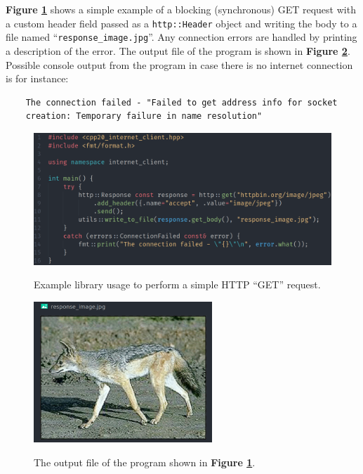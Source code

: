\documentclass[12pt, a4paper]{article}
\begin{document}
\textbf{Figure \ref{fig:get_request_example}} shows a simple example of a blocking (synchronous) GET request with a custom header field passed as a \texttt{http::Header} object and writing the body to a file named “\texttt{response\_image.jpg}”. Any connection errors are handled by printing a description of the error. The output file of the program is shown in \textbf{Figure \ref{fig:get_request_output}}. Possible console output from the program in case there is no internet connection is for instance:
\begin{verbatim}
    The connection failed - "Failed to get address info for socket 
    creation: Temporary failure in name resolution"
\end{verbatim}

\begin{figure}[hp]
	\centering
	\caption{Example library usage to perform a simple HTTP “GET” request.}
	\includegraphics[width=\textwidth]{get_request_example}
	\label{fig:get_request_example}
\end{figure}

\begin{figure}[hp]
	\centering
	\caption{The output file of the program shown in \textbf{Figure \ref{fig:get_request_example}}.}
	\includegraphics[width=0.6\textwidth]{get_request_output}
	\label{fig:get_request_output}
\end{figure}
\end{document}
